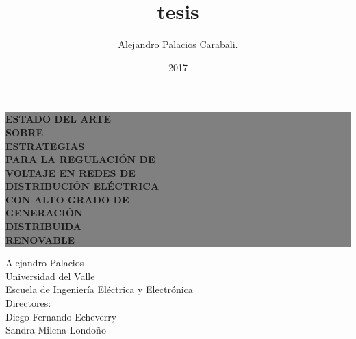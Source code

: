\documentclass[12pt, letterpaper]{report}
\begin{document}
\title{tesis}
\author{Alejandro Palacios Carabali.}
\date{2017}
\thispagestyle{empty}%
\colorbox{grey}{
	\parbox[t]{1.0\linewidth}{
		\centering \fontsize{20pt}{30pt}\selectfont %
		\vspace*{0.7cm} %

		\hfill \textbf{ ESTADO DEL ARTE}\\ 
		\hfill \textbf{SOBRE }\\
		\hfill \textbf{ESTRATEGIAS }\\
		\hfill \textbf{PARA LA REGULACIÓN DE} \\
		\hfill \textbf{VOLTAJE EN REDES DE } \\ 
		\hfill \textbf{DISTRIBUCIÓN ELÉCTRICA } \\ 
		\hfill \textbf{CON ALTO GRADO DE}\\
		\hfill \textbf{GENERACIÓN }\\
		\hfill \textbf{DISTRIBUIDA }\\
		\hfill \textbf{RENOVABLE }\\
		\par

		\vspace*{0.7cm} %
	}
}


\vfill %


{\centering \large 
\hfill Alejandro Palacios \\
\hfill Universidad del Valle \\
\hfill Escuela de Ingeniería Eléctrica y Electrónica \\
\hfill Directores:\\
\hfill Diego Fernando Echeverry\\
\hfill Sandra Milena Londoño\\

}
\end{document}
